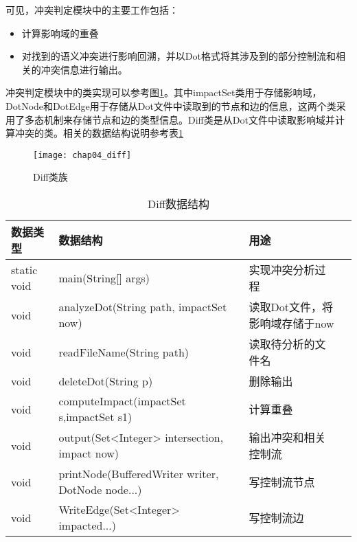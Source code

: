 可见，冲突判定模块中的主要工作包括：
\begin{itemize}
	\item 计算影响域的重叠
	\item 对找到的语义冲突进行影响回溯，并以Dot格式将其涉及到的部分控制流和相关的冲突信息进行输出。
\end{itemize}

冲突判定模块中的类实现可以参考图\ref {diff}。其中impactSet类用于存储影响域，DotNode和DotEdge用于存储从Dot文件中读取到的节点和边的信息，这两个类采用了多态机制来存储节点和边的类型信息。Diff类是从Dot文件中读取影响域并计算冲突的类。相关的数据结构说明参考表\ref {diff_data}

\begin{figure}[H]
	\centering
	\texttt{[image: chap04\_diff]}
	\caption {Diff类族}
	\label {diff}	
\end{figure}

\begin{table}[H]
	\caption{Diff数据结构}
	\label{diff_data}
	\centering
	\begin{tabular}{lllc}
		\toprule[1.5pt]
		{\heiti 数据类型} &{\heiti 数据结构} & {\heiti 用途} \\\midrule[1pt]
		static void & main(String[] args) & 实现冲突分析过程\\
		void & analyzeDot(String path, impactSet now) & 读取Dot文件，将影响域存储于now \\
		void & readFileName(String path) & 读取待分析的文件名\\
		void & deleteDot(String p) & 删除输出\\
		void & computeImpact(impactSet s,impactSet s1) & 计算重叠\\
		void & output(Set<Integer> intersection, impact now) & 输出冲突和相关控制流\\
		void & printNode(BufferedWriter writer, DotNode node...) & 写控制流节点\\
		void &  WriteEdge(Set<Integer>  impacted...) & 写控制流边\\
		\bottomrule[1.5pt] 
	\end{tabular}
\end{table}

